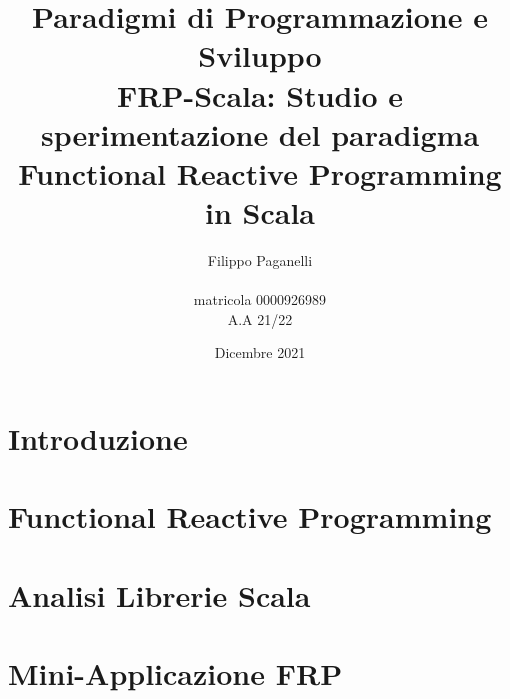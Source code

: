 \documentclass{report}
\title{\LARGE \textbf{Paradigmi di Programmazione e Sviluppo} \\ FRP-Scala: Studio e sperimentazione del paradigma Functional Reactive Programming in Scala
}
\author{
    Filippo Paganelli \\ \emailaddr{filippo.paganelli3@studio.unibo.it}
    \\ matricola 0000926989 \\ A.A 21/22
}
\date{Dicembre 2021}
\begin{document}
\maketitle
\newpage
\tableofcontents

\newpage
\chapter{Introduzione}\label{analisi}


\newpage
\chapter{Functional Reactive Programming}\label{analisi}


\newpage
\chapter{Analisi Librerie Scala}\label{analisi}


\newpage
\chapter{Mini-Applicazione FRP}\label{analisi}


\newpage
\nocite{*} %


\end{document}
